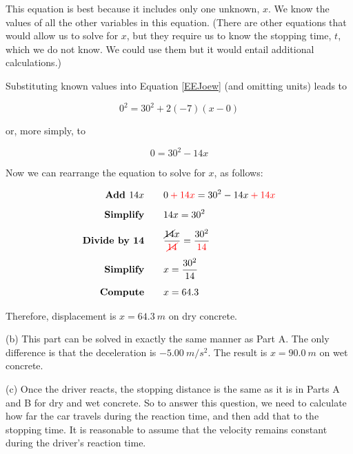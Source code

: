\documentclass[dvipsnames]{article}
\begin{document}
This equation is best because it includes only one unknown, $x$. We know the values of all the other variables in this equation. (There are other equations that would allow us to solve for $x$, but they require us to know the stopping time, $t$, which we do not know. We could use them but it would entail additional calculations.)

\vspace{1em}

Substituting known values into Equation \eqref{EEJoew} (and omitting units) leads to 

\begin{equation*}
    0^2 = 30^2 + 2\left(-7\right) \left(x-0\right)
\end{equation*}

or, more simply, to 

\begin{equation*}
    0 = 30^2 - 14 x
\end{equation*}

Now we can rearrange the equation to solve for $x$, as follows:

\begin{align*}
    \textbf{Add $14x$} \qquad & 0 \mathbin{\color{red} +} \textcolor{red}{14x} = 30^2 -14x \mathbin{\color{red} +} \textcolor{red}{14x}\\[1ex]
    \textbf{Simplify} \qquad & 14x = 30^2\\[1ex]
    \textbf{Divide by 14} \qquad & \frac{\cancel{14}x}{\textcolor{red}{\cancel{14}}} = \frac{30^2}{\textcolor{red}{14}}\\[1ex]
    \textbf{Simplify} \qquad & x = \frac{30^2}{14} \\[1ex]
    \textbf{Compute} \qquad & x = 64.3
\end{align*}

Therefore, displacement is $x = \SI{64.3}{m}$ on dry concrete.

\vspace{1em}

(b) This part can be solved in exactly the same manner as Part A. The only difference is that the deceleration is $-\SI{5.00}{m/s^2}$. The result is $x = \SI{90.0}{m}$ on wet concrete.

\vspace{1em}

(c) Once the driver reacts, the stopping distance is the same as it is in Parts A and B for dry and wet concrete. So to answer this question, we need to calculate how far the car travels during the reaction time, and then add that to the stopping time. It is reasonable to assume that the velocity remains constant during the driver’s reaction time.
\end{document}
